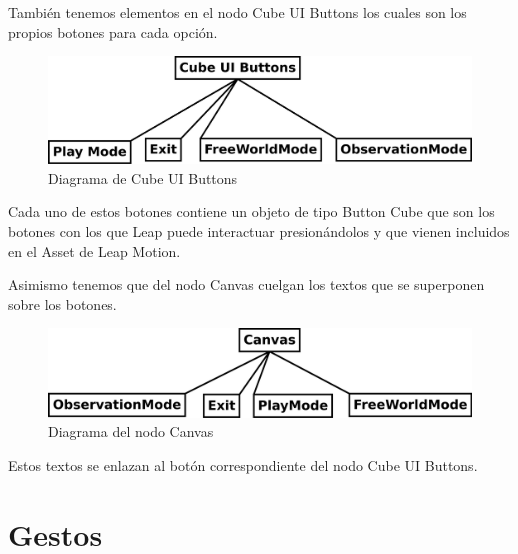 \documentclass[a4paper,11pt]{article}
\begin{document}
\vspace{20px}

También tenemos elementos en el nodo Cube UI Buttons los cuales son los propios botones para cada opción.

\begin{figure}[!h]
	\includegraphics[scale=0.57]{./Imagenes/Cube_UI_Buttons.png}
	\caption{Diagrama de Cube UI Buttons}
	\label{cubeUIButtons}
\end{figure}

Cada uno de estos botones contiene un objeto de tipo Button Cube que son los botones con los que Leap puede interactuar presionándolos y que vienen incluidos en el Asset de Leap Motion.

\vspace{10px}

Asimismo tenemos que del nodo Canvas cuelgan los textos que se superponen sobre los botones.

\begin{figure}[!h]
	\includegraphics[scale=0.56]{./Imagenes/Canvas.png}
	\caption{Diagrama del nodo Canvas}
	\label{canvas}
\end{figure}

Estos textos se enlazan al botón correspondiente del nodo Cube UI Buttons.

\section{Gestos}
\end{document}
